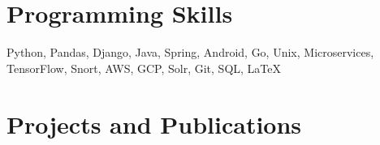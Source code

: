 \documentclass[a4paper,10pt]{article}
\makeatletter
\newcommand{\projectHeading}[2]{
    \begin{tabular*}{1\textwidth}{l@{\extracolsep{\fill}}r}
      \large{\textbf{#1}} & \small{#2} 
    \end{tabular*}
}
\newcommand{\resumeItemListStart}{\begin{itemize}[topsep=2pt, parsep=2pt, listparindent=0pt, itemindent=0pt, itemsep=1pt, leftmargin=*]}
\newcommand{\resumeItemListEnd}{\end{itemize}}
\makeatother
\begin{document}
   
%   

      
 
    

\section{Programming Skills}
 \small{Python, Pandas, Django, \hfill{} Java, Spring, Android, Go, Unix, \hfill{} Microservices, \hfill{} TensorFlow, Snort, \hfill{} AWS, GCP, \hfill{} Solr, \hfill{} Git, SQL, \LaTeX}
		

\section{Projects and Publications}
    
\end{document}
